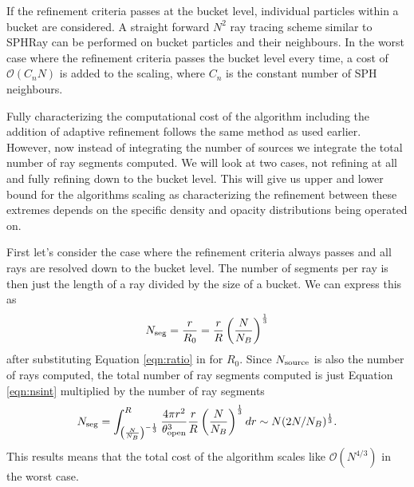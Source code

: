 \documentclass[fleq,usenatbib]{mnras}
\newcommand{\bigO}[1]{\mathcal{O}\left(#1\right)}
\newcommand{\NS}{N_{\rm source}}
\newcommand{\tO}{\theta_{\rm open}}
\begin{document}
If the refinement criteria passes at the bucket level, individual particles 
within a bucket are considered. A straight forward $N^2$ ray tracing scheme 
similar to SPHRay \citep{altayEt08} can be performed on bucket particles and 
their neighbours. In the worst case where the refinement criteria passes the 
bucket level every time, a cost of $\bigO{C_n N}$ is added to the scaling, 
where $C_n$ is the constant number of SPH neighbours.

Fully characterizing the computational cost of the algorithm including the 
addition of adaptive refinement follows the same method as used earlier. 
However, now instead of integrating the number of sources we integrate the 
total number of ray segments computed. We will look at two cases, not refining 
at all and fully refining down to the bucket level. This will give us upper 
and lower bound for the algorithms scaling as characterizing the refinement 
between these extremes depends on the specific density and opacity 
distributions being operated on.

First let's consider the case where the refinement criteria always passes and 
all rays are resolved down to the bucket level. The number of segments per ray 
is then just the length of a ray divided by the size of a bucket. We can 
express this as
\begin{equation}
\label{eqn:nseg}
N_{\rm seg} = \frac{r}{R_0} = \frac{r}{R}\left(\frac{N}{N_B}\right)^\frac{1}{3}
\end{equation}
after substituting Equation \ref{eqn:ratio} in for $R_0$. Since $\NS$ is also 
the number of rays computed, the total number of ray segments computed is just 
Equation \ref{eqn:nsint} multiplied by the number of ray segments
\begin{equation}
\label{eqn:nsegint}
N_{\rm seg} = \int_{\left(\frac{N}{N_B}\right)^{-\frac{1}{3}}}^R 
\frac{4\pi r^2}{\tO^3}
\frac{r}{R}\left(\frac{N}{N_B}\right)^\frac{1}{3} dr
\sim N(2N/N_B)^\frac{1}{3}.
\end{equation}
This results means that the total cost of the algorithm scales like 
$\bigO{N^{4/3}}$ in the worst case.
\end{document}
